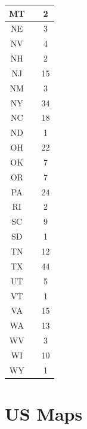 \documentclass[a4paper,10pt,calibri,oneside,openany, twocolumn]{report}
\theoremstyle{break}
\begin{document}
\begin{table}[H]
\begin{tabular}{|c|c|c|}
	MT & &2\\
	\hline
	NE & &3\\
	\hline
	NV & &4\\
	\hline
	NH & &2\\
	\hline
	NJ & &15\\
	\hline
	NM & &3\\
	\hline
	NY & &34\\
	\hline
	NC & &18\\
	\hline
	ND & &1\\
	\hline
	OH & &22\\
	\hline
	OK & &7\\
	\hline
	OR & &7\\
	\hline
	PA & &24\\
	\hline
	RI & &2\\
	\hline
	SC & &9\\
	\hline
	SD & &1\\
	\hline
	TN & &12\\
	\hline
	TX & &44\\
	\hline
	UT & &5\\
	\hline
	VT & &1\\
	\hline
	VA & &15\\
	\hline
	WA & &13\\
	\hline
	WV & &3\\
	\hline
	WI & &10\\
	\hline
	WY & &1\\
	\hline
	\end{tabular}
\end{table}


\section*{US Maps}
\end{document}
